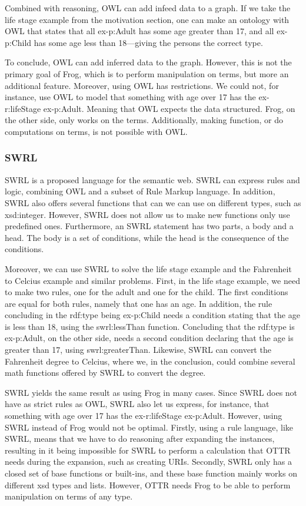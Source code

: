 \para
Combined with reasoning, OWL can add infeed data to a graph. If we take the life stage example from the motivation section, one can make an ontology with OWL that states that all ex-p:Adult has some age greater than 17, and all ex-p:Child has some age less than 18—giving the persons the correct type.

\para 
To conclude, OWL can add inferred data to the graph. However, this is not the primary goal of Frog, which is to perform manipulation on terms, but more an additional feature. Moreover, using OWL has restrictions. We could not, for instance, use OWL to model that something with age over 17 has the ex-r:lifeStage ex-p:Adult. Meaning that OWL expects the data structured. Frog, on the other side, only works on the terms. Additionally, making function, or do computations on terms, is not possible with OWL. 

\subsubsection{SWRL}
SWRL is a proposed language for the semantic web. SWRL can express rules and logic, combining OWL and a subset of Rule Markup language. In addition, SWRL also offers several functions that can we can use on different types, such as xsd:integer. However, SWRL does not allow us to make new functions only use predefined ones. Furthermore, an SWRL statement has two parts, a body and a head. The body is a set of conditions, while the head is the consequence of the conditions.

\para
Moreover, we can use SWRL to solve the life stage example and the Fahrenheit to Celcius example and similar problems. First, in the life stage example, we need to make two rules, one for the adult and one for the child. The first conditions are equal for both rules, namely that one has an age. In addition, the rule concluding in the rdf:type being ex-p:Child needs a condition stating that the age is less than 18, using the swrl:lessThan function. Concluding that the rdf:type is ex-p:Adult, on the other side, needs a second condition declaring that the age is greater than 17, using swrl:greaterThan. Likewise, SWRL can convert the Fahrenheit degree to Celcius, where we, in the conclusion, could combine several math functions offered by SWRL to convert the degree.

\para
SWRL yields the same result as using Frog in many cases. Since SWRL does not have as strict rules as OWL, SWRL also let us express, for instance, that something with age over 17 has the ex-r:lifeStage ex-p:Adult. However, using SWRL instead of Frog would not be optimal. Firstly, using a rule language, like SWRL, means that we have to do reasoning after expanding the instances, resulting in it being impossible for SWRL to perform a calculation that OTTR needs during the expansion, such as creating URIs. Secondly, SWRL only has a closed set of base functions or built-ins, and these base function mainly works on different xsd types and lists. However, OTTR needs Frog to be able to perform manipulation on terms of any type. 

